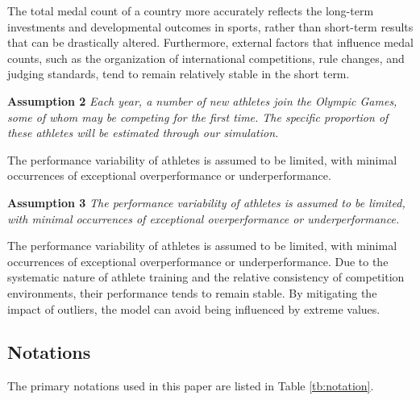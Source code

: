 \documentclass[12pt]{article}  %
\begin{document}
The total medal count of a country more accurately reflects the long-term investments and developmental outcomes in sports, rather than short-term results that can be drastically altered. Furthermore, external factors that influence medal counts, such as the organization of international competitions, rule changes, and judging standards, tend to remain relatively stable in the short term.


\textbf{Assumption 2 } \textit{Each year, a number of new athletes join the Olympic Games, some of whom may be competing for the first time. The specific proportion of these athletes will be estimated through our simulation. }

The performance variability of athletes is assumed to be limited, with minimal occurrences of exceptional overperformance or underperformance.  


\textbf{Assumption 3} \textit{ The performance variability of athletes is assumed to be limited, with minimal occurrences of exceptional overperformance or underperformance.  }

The performance variability of athletes is assumed to be limited, with minimal occurrences of exceptional overperformance or underperformance.  
Due to the systematic nature of athlete training and the relative consistency of competition environments, their performance tends to remain stable. By mitigating the impact of outliers, the model can avoid being influenced by extreme values.  

\subsection{Notations}

The primary notations used in this paper are listed in Table \ref{tb:notation}.
\end{document}
